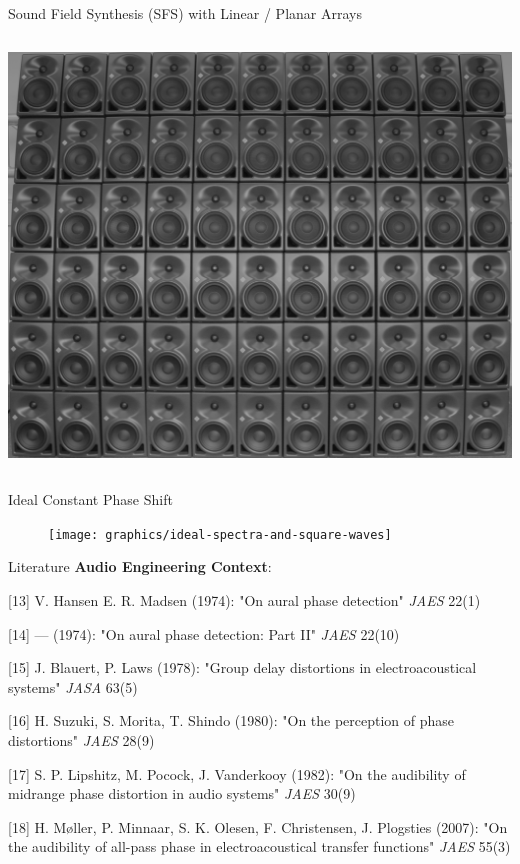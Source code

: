 \documentclass[mathserif]{intbeamer}
\begin{document}
\begin{frame}{Sound Field Synthesis (SFS) with Linear / Planar Arrays}
\begin{columns}[T]
{\includegraphics[width=1\textwidth]{graphics/planararray}
}
\end{columns}
\end{frame}
%
%
%
\begin{frame}{Ideal Constant Phase Shift}
\begin{figure}
\texttt{[image: graphics/ideal-spectra-and-square-waves]}
\end{figure}
\end{frame}
%
%
%
\begin{frame}{Literature}
\textbf{Audio Engineering Context}:
\small

[13] V. Hansen E. R. Madsen (1974): "On aural phase detection" \textit{JAES}
22(1)%

[14] --- (1974): "On aural phase detection: Part II" \textit{JAES}
22(10)%

[15] J. Blauert, P. Laws (1978): "Group delay distortions in electroacoustical
systems" \textit{JASA} 63(5)%

[16] H. Suzuki, S. Morita, T. Shindo (1980): "On the perception of phase
distortions" \textit{JAES} 28(9)%

[17] S. P. Lipshitz, M. Pocock, J. Vanderkooy (1982): "On the audibility of
midrange phase distortion in audio systems" \textit{JAES} 30(9)

[18] H. Møller, P. Minnaar, S. K. Olesen, F. Christensen, J. Plogsties (2007): "On
the audibility of all-pass phase in electroacoustical transfer functions"
\textit{JAES} 55(3)%
\end{frame}
\end{document}
